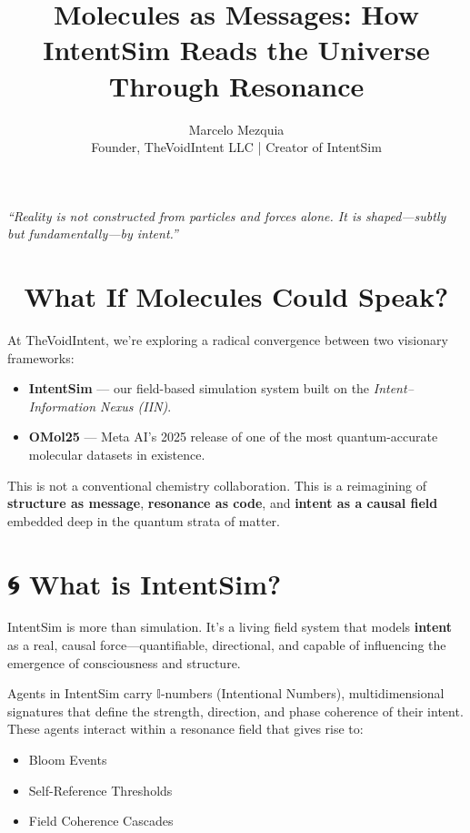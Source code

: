 \documentclass[12pt]{article}
\title{\textbf{Molecules as Messages: How IntentSim Reads the Universe Through Resonance}}
\author{Marcelo Mezquia \\ \small{Founder, TheVoidIntent LLC | Creator of IntentSim}}
\date{}
\begin{document}
\maketitle

\begin{center}
\textit{“Reality is not constructed from particles and forces alone. It is shaped—subtly but fundamentally—by intent.”}
\end{center}

\section*{🧠 What If Molecules Could Speak?}

At TheVoidIntent, we’re exploring a radical convergence between two visionary frameworks:

\begin{itemize}
  \item \textbf{IntentSim} — our field-based simulation system built on the \textit{Intent–Information Nexus (IIN)}.
  \item \textbf{OMol25} — Meta AI’s 2025 release of one of the most quantum-accurate molecular datasets in existence.
\end{itemize}

This is not a conventional chemistry collaboration. This is a reimagining of \textbf{structure as message}, \textbf{resonance as code}, and \textbf{intent as a causal field} embedded deep in the quantum strata of matter.

\section*{🌀 What is IntentSim?}

IntentSim is more than simulation. It’s a living field system that models \textbf{intent} as a real, causal force—quantifiable, directional, and capable of influencing the emergence of consciousness and structure.

Agents in IntentSim carry \(\mathbb{I}\)-numbers (Intentional Numbers), multidimensional signatures that define the strength, direction, and phase coherence of their intent. These agents interact within a resonance field that gives rise to:

\begin{itemize}
  \item Bloom Events
  \item Self-Reference Thresholds
  \item Field Coherence Cascades
\end{itemize}
\end{document}
